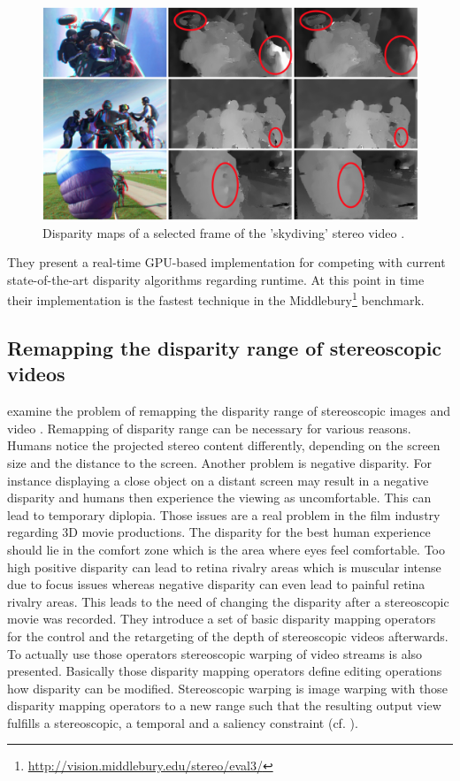 \begin{figure}[h!]
  \centering
  \includegraphics[width=1.0\textwidth]{src/images/dbcgrid.png}
  \caption[Disparity maps of a selected frame of the 'skydiving' stereo video]{Disparity maps of a selected frame of the 'skydiving' stereo video \citep{richardt2010real}.}
  \label{fig:dbcgrid}
\end{figure}

\noindent They present a real-time GPU-based implementation for competing with current state-of-the-art disparity algorithms regarding runtime.
At this point in time their implementation is the fastest technique in the Middlebury\footnote{\url{http://vision.middlebury.edu/stereo/eval3/}} benchmark.

\subsection{Remapping the disparity range of stereoscopic videos}

\citeauthor{lang2010nonlinear} examine the problem of remapping the disparity range of stereoscopic images and video \citep{lang2010nonlinear}.
Remapping of disparity range can be necessary for various reasons.
Humans notice the projected stereo content differently, depending on the screen size and the distance to the screen.
Another problem is negative disparity.
For instance displaying a close object on a distant screen may result in a negative disparity and humans then experience the viewing as uncomfortable.
This can lead to temporary diplopia.
Those issues are a real problem in the film industry regarding 3D movie productions.
The disparity for the best human experience should lie in the comfort zone which is the area where eyes feel comfortable.
Too high positive disparity can lead to retina rivalry areas which is muscular intense due to focus issues whereas negative disparity can even lead to painful retina rivalry areas.
This leads to the need of changing the disparity after a stereoscopic movie was recorded.
They introduce a set of basic disparity mapping operators for the control and the retargeting of the depth of stereoscopic videos afterwards.
To actually use those operators stereoscopic warping of video streams is also presented.
Basically those disparity mapping operators define editing operations how disparity can be modified.
Stereoscopic warping is image warping with those disparity mapping operators to a new range such that the resulting output view fulfills a stereoscopic, a temporal and a saliency constraint (cf. \citep{lang2010nonlinear}).
